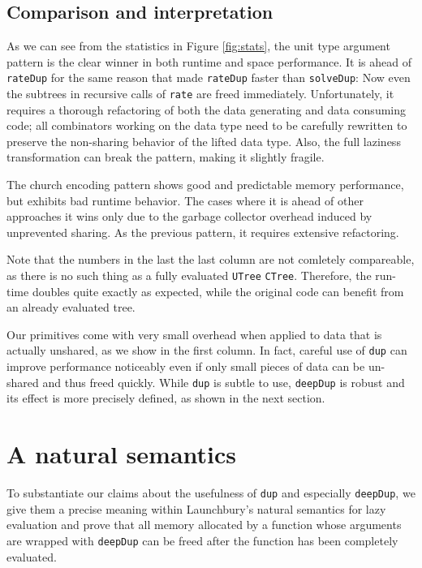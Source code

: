 \documentclass[preprint]{sigplanconf}
\theoremstyle{nonumberplain}
\newcommand{\li}{\lstinline[style=Haskell]}
\begin{document}
\subsection{Comparison and interpretation}

As we can see from the statistics in Figure \ref{fig:stats}, the unit type argument pattern is the clear winner in both runtime and space performance. It is ahead of \li-rateDup- for the same reason that made \li-rateDup- faster than \li-solveDup-: Now even the subtrees in recursive calls of \li-rate- are freed immediately.
Unfortunately, it requires a thorough refactoring of both the data generating and data consuming code; all combinators working on the data type need to be carefully rewritten to preserve the non-sharing behavior of the lifted data type. Also, the full laziness transformation can break the pattern, making it slightly fragile.

The church encoding pattern shows good and predictable memory performance, but exhibits bad runtime behavior. The cases where it is ahead of other approaches it wins only due to the garbage collector overhead induced by unprevented sharing. As the previous pattern, it requires extensive refactoring.

Note that the numbers in the last the last column are not comletely compareable, as there is no such thing as a fully evaluated \li-UTree- \li-CTree-. Therefore, the run-time doubles quite exactly as expected, while the original code can benefit from an already evaluated tree.

Our primitives come with very small overhead when applied to data that is actually unshared, as we show in the first column. In fact, careful use of \li-dup- can improve performance noticeably even if only small pieces of data can be un-shared and thus freed quickly. While \li-dup- is subtle to use, \li-deepDup- is robust and its effect is more precisely defined, as shown in the next section.

\section{A natural semantics}
\label{sec:semantics}

To substantiate our claims about the usefulness of \li-dup- and especially \li-deepDup-, we give them a precise meaning within Launchbury’s natural semantics for lazy evaluation \citep{launchbury} and prove that all memory allocated by a function whose arguments are wrapped with \li-deepDup- can be freed after the function has been completely evaluated.
\end{document}

